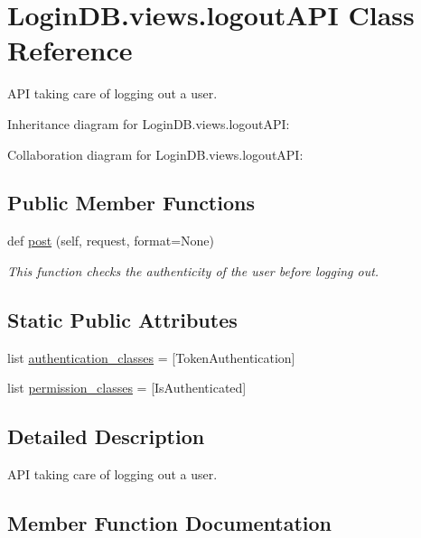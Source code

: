 \hypertarget{class_login_d_b_1_1views_1_1logout_a_p_i}{}\section{Login\+D\+B.\+views.\+logout\+A\+PI Class Reference}
\label{class_login_d_b_1_1views_1_1logout_a_p_i}


A\+PI taking care of logging out a user.  




Inheritance diagram for Login\+D\+B.\+views.\+logout\+A\+PI\+:


Collaboration diagram for Login\+D\+B.\+views.\+logout\+A\+PI\+:
\subsection*{Public Member Functions}
\begin{DoxyCompactItemize}
\item 
def \hyperlink{class_login_d_b_1_1views_1_1logout_a_p_i_a1d8a12ce751865574fcfadf4e12549c4}{post} (self, request, format=None)
\begin{DoxyCompactList}\small\item\em This function checks the authenticity of the user before logging out. \end{DoxyCompactList}\end{DoxyCompactItemize}
\subsection*{Static Public Attributes}
\begin{DoxyCompactItemize}
\item 
list \hyperlink{class_login_d_b_1_1views_1_1logout_a_p_i_addd5aaad214346e3d7895cbfa458e752}{authentication\+\_\+classes} = \mbox{[}Token\+Authentication\mbox{]}
\item 
list \hyperlink{class_login_d_b_1_1views_1_1logout_a_p_i_a26713c74c039579b0b048a0a6239f048}{permission\+\_\+classes} = \mbox{[}Is\+Authenticated\mbox{]}
\end{DoxyCompactItemize}


\subsection{Detailed Description}
A\+PI taking care of logging out a user. 

\subsection{Member Function Documentation}
\mbox{\label{class_login_d_b_1_1views_1_1logout_a_p_i_a1d8a12ce751865574fcfadf4e12549c4}} 
